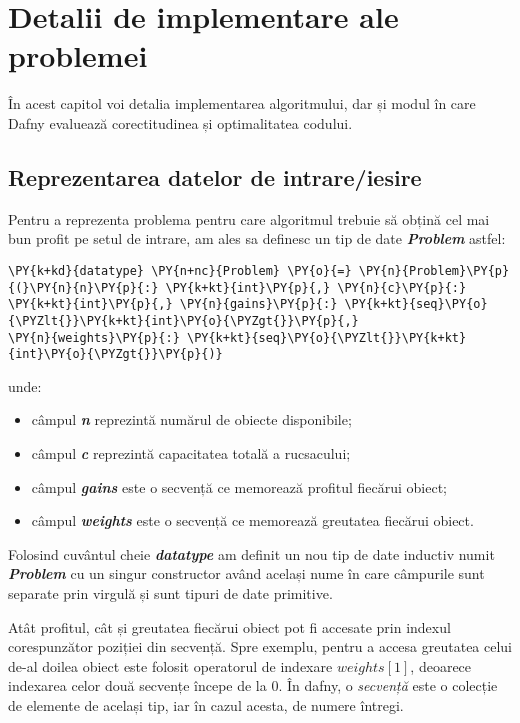 \lstset{style=mylststyle}

\chapter{Detalii de implementare ale problemei}
\begin{sloppypar}
În acest capitol voi detalia implementarea algoritmului, dar și modul în care Dafny evaluează corectitudinea și optimalitatea codului. 

\section{Reprezentarea datelor de intrare/iesire}

Pentru a reprezenta problema pentru care algoritmul trebuie să obțină cel mai bun profit pe setul de intrare, am ales sa definesc un tip de date \textbf{\textit{\textcolor{coleight}{Problem}}} astfel:

\begin{Verbatim}[commandchars=\\\{\}]
\PY{k+kd}{datatype} \PY{n+nc}{Problem} \PY{o}{=} \PY{n}{Problem}\PY{p}{(}\PY{n}{n}\PY{p}{:} \PY{k+kt}{int}\PY{p}{,} \PY{n}{c}\PY{p}{:} \PY{k+kt}{int}\PY{p}{,} \PY{n}{gains}\PY{p}{:} \PY{k+kt}{seq}\PY{o}{\PYZlt{}}\PY{k+kt}{int}\PY{o}{\PYZgt{}}\PY{p}{,} 
\PY{n}{weights}\PY{p}{:} \PY{k+kt}{seq}\PY{o}{\PYZlt{}}\PY{k+kt}{int}\PY{o}{\PYZgt{}}\PY{p}{)} 
\end{Verbatim}
unde:
\begin{itemize}
    \item câmpul \textit{\textbf{\textcolor{coleight}{n}}} reprezintă numărul de obiecte disponibile;
    \item câmpul \textit{\textbf{\textcolor{coleight}{c}}} reprezintă capacitatea totală a rucsacului;
    \item câmpul \textit{\textbf{\textcolor{coleight}{gains}}} este o secvență ce memorează profitul fiecărui obiect;
    \item câmpul \textit{\textbf{\textcolor{coleight}{weights}}} este o secvență ce memorează greutatea fiecărui obiect.
\end{itemize} \par
Folosind cuvântul cheie \textit{\textbf{\textcolor{coleight}{datatype}}} am definit un nou tip de date inductiv numit \textit{\textbf{\textcolor{coleight}{Problem}}} cu un singur constructor având același nume în care câmpurile sunt separate prin virgulă și sunt tipuri de date primitive.
\par
Atât profitul, cât și greutatea fiecărui obiect pot fi accesate prin indexul corespunzător poziției din secvență. Spre exemplu, pentru a accesa greutatea celui de-al doilea obiect este folosit operatorul de indexare $weights[1]$, deoarece indexarea celor două secvențe începe de la 0. În dafny, o \textit{secvență} este o colecție de elemente de același tip, iar în cazul acesta, de numere întregi. \\ \par


\end{sloppypar}
